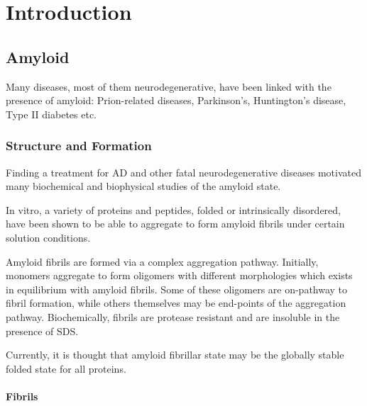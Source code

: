 \chapter{Introduction}


\section{Amyloid}
Many diseases, most of them neurodegenerative, have been linked with the presence of amyloid: Prion-related diseases, Parkinson's, Huntington's disease, Type II diabetes etc.

\subsection{Structure and Formation}
	Finding a treatment for AD and other fatal neurodegenerative diseases motivated many biochemical and biophysical studies of the amyloid state.  

  \begin{outline}[enumerate]
	\1 In vitro, a variety of proteins and peptides, folded or intrinsically disordered, have been shown to be able to aggregate to form amyloid fibrils under certain solution conditions. 

	\1 Amyloid fibrils are formed via a complex aggregation pathway. Initially, monomers aggregate to form oligomers with different morphologies which exists in equilibrium with amyloid fibrils. Some of these oligomers are on-pathway to fibril formation, while others themselves may be end-points of the aggregation pathway. Biochemically, fibrils are protease resistant and are insoluble in the presence of SDS.

   \1 Currently, it is thought that amyloid fibrillar state may be the globally stable folded state for all proteins.
  \end{outline}

 \subsubsection{Fibrils}
    \label{ssub:structure}


